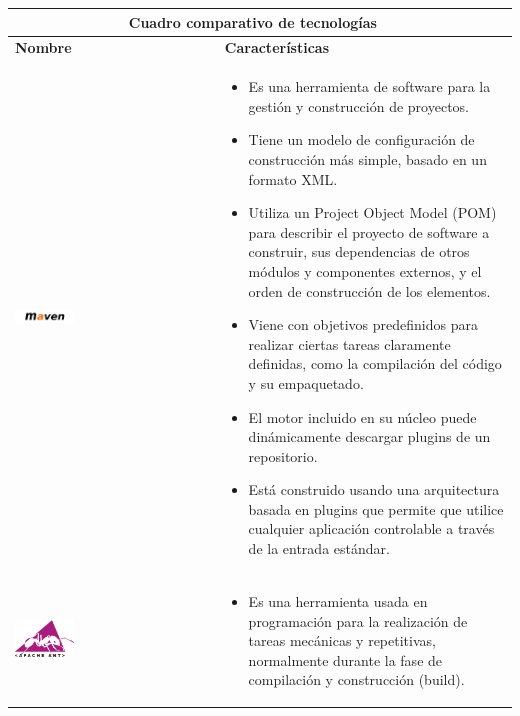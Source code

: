 \newpage
\begin{table}[b!]
	\centering
	\vspace{-30mm}
	\begin{tabular}{|p{2cm}|ll}
		\hline
		\multicolumn{2}{|c|}{{\bf Cuadro comparativo de tecnologías}} \\ 
		\hline
		\multicolumn{1}{|p{4cm}|}{{\bf Nombre}}                                        &   
		\multicolumn{1}{p{10cm}|}{{\bf Características}}\\
		\hline
		\multicolumn{1}{|p{5cm}|}{\includegraphics[width=0.3\textwidth]{images/maven}} &   
		\multicolumn{2}{p{10cm}|}{\begin{itemize}
		\vspace{-10mm}
		\item Es una herramienta de software para la gestión y construcción de proyectos.
		\item Tiene un modelo de configuración de construcción más simple, basado en un formato XML.
		\item Utiliza un Project Object Model (POM) para describir el proyecto de software a construir, sus dependencias de otros 				módulos y componentes externos, y el orden de construcción de los elementos.
		\item  Viene con objetivos predefinidos para realizar ciertas tareas claramente definidas, como la compilación del código y su 		empaquetado.
		\item El motor incluido en su núcleo puede dinámicamente descargar plugins de un repositorio.
		\item Está construido usando una arquitectura basada en plugins que permite que utilice cualquier aplicación controlable a través de la entrada estándar. 
		\cite{36}
		\end{itemize}} \\
		\hline
		\multicolumn{1}{|p{5cm}|}{\includegraphics[width=0.3\textwidth]{images/ant}}   &   
		\multicolumn{1}{p{10cm}|}{
		\begin{itemize}
		\vspace{-27mm}
		\item Es una herramienta usada en programación para la realización de tareas mecánicas y repetitivas, normalmente durante la fase de compilación y construcción (build). 

\end{itemize}}
\end{tabular}
\end{table}
